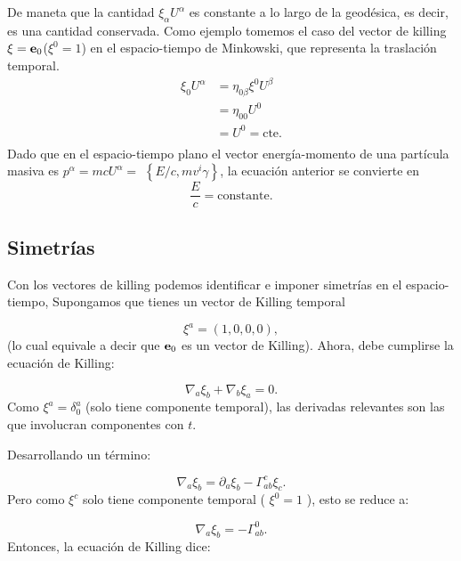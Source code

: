 De maneta que la cantidad $\xi_\alpha U^\alpha$ es constante a lo largo de la geodésica, es decir, es una cantidad conservada.
Como ejemplo tomemos el caso del vector de killing $\mathbf{\xi} = \mathbf{e}_0$($\xi^0 =1$) en el espacio-tiempo de Minkowski, que representa la traslación temporal. 
\begin{equation}
    \begin{aligned}
        \xi_0 U^\alpha & = \eta_{0 \beta} \xi^0 U^\beta \\
        & = \eta_{0 0 } U^0 \\
        & = U^0 = \text{cte.} \\
    \end{aligned}
\end{equation} 
Dado que en el espacio-tiempo plano el vector energía-momento de una partícula masiva es $p^\alpha=m c U^\alpha=$ $\left\{E / c, m v^i \gamma\right\}$, la ecuación anterior se convierte en
\[
    \frac{E}{c}=\text{constante}.
\]


\subsection{Simetrías }
Con los  vectores de killing podemos identificar e imponer simetrías en el espacio-tiempo,
Supongamos que tienes un vector de Killing temporal

\begin{equation}
    \xi^a=(1,0,0,0),   
\end{equation}
(lo cual equivale a decir que $\mathbf{e}_0$ es un vector de Killing).
Ahora, debe cumplirse la ecuación de Killing:

\begin{equation}
    \nabla_a \xi_b+\nabla_b \xi_a=0.
\end{equation}
Como $\xi^a=\delta_0^a$ (solo tiene componente temporal), las derivadas relevantes son las que involucran componentes con $t$.

Desarrollando un término:

\begin{equation}
    \nabla_a \xi_b=\partial_a \xi_b-\Gamma_{a b}^c \xi_c.
\end{equation}
Pero como $\xi^c$ solo tiene componente temporal ( $\xi^0=1$ ), esto se reduce a:

\begin{equation}
    \nabla_a \xi_b=-\Gamma_{a b}^0   . 
\end{equation}
Entonces, la ecuación de Killing dice:

